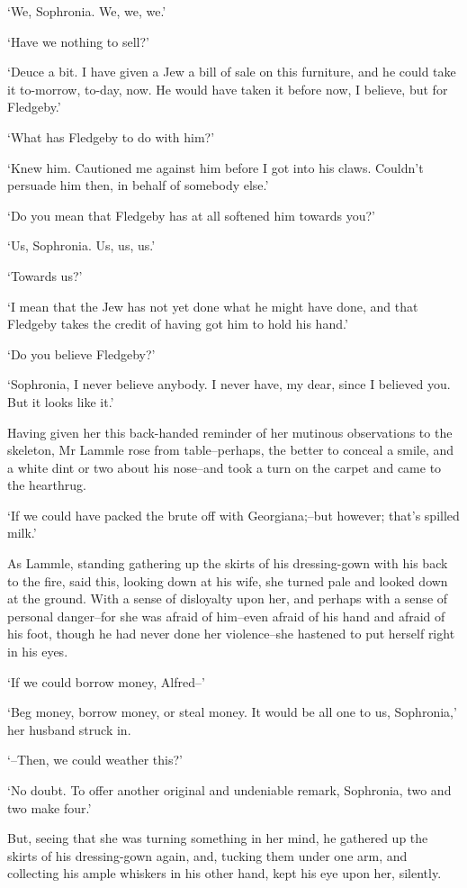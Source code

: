 ‘We, Sophronia. We, we, we.’

‘Have we nothing to sell?’

‘Deuce a bit. I have given a Jew a bill of sale on this furniture, and
he could take it to-morrow, to-day, now. He would have taken it before
now, I believe, but for Fledgeby.’

‘What has Fledgeby to do with him?’

‘Knew him. Cautioned me against him before I got into his claws.
Couldn’t persuade him then, in behalf of somebody else.’

‘Do you mean that Fledgeby has at all softened him towards you?’

‘Us, Sophronia. Us, us, us.’

‘Towards us?’

‘I mean that the Jew has not yet done what he might have done, and that
Fledgeby takes the credit of having got him to hold his hand.’

‘Do you believe Fledgeby?’

‘Sophronia, I never believe anybody. I never have, my dear, since I
believed you. But it looks like it.’

Having given her this back-handed reminder of her mutinous observations
to the skeleton, Mr Lammle rose from table--perhaps, the better to
conceal a smile, and a white dint or two about his nose--and took a turn
on the carpet and came to the hearthrug.

‘If we could have packed the brute off with Georgiana;--but however;
that’s spilled milk.’

As Lammle, standing gathering up the skirts of his dressing-gown with
his back to the fire, said this, looking down at his wife, she turned
pale and looked down at the ground. With a sense of disloyalty upon
her, and perhaps with a sense of personal danger--for she was afraid of
him--even afraid of his hand and afraid of his foot, though he had never
done her violence--she hastened to put herself right in his eyes.

‘If we could borrow money, Alfred--’

‘Beg money, borrow money, or steal money. It would be all one to us,
Sophronia,’ her husband struck in.

‘--Then, we could weather this?’

‘No doubt. To offer another original and undeniable remark, Sophronia,
two and two make four.’

But, seeing that she was turning something in her mind, he gathered up
the skirts of his dressing-gown again, and, tucking them under one arm,
and collecting his ample whiskers in his other hand, kept his eye upon
her, silently.

